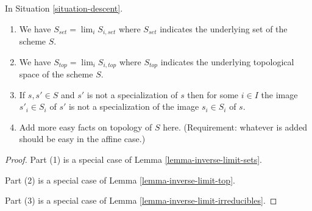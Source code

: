 \begin{lemma}
\label{lemma-topology-limit}
In Situation \ref{situation-descent}.
\begin{enumerate}
\item We have $S_{set} = \lim_i S_{i, set}$ where $S_{set}$
indicates the underlying set of the scheme $S$.
\item We have $S_{top} = \lim_i S_{i, top}$ where $S_{top}$
indicates the underlying topological space of the scheme $S$.
\item If $s, s' \in S$ and $s'$ is not a specialization of $s$
then for some $i \in I$ the image $s'_i \in S_i$ of $s'$ is not
a specialization of the image $s_i \in S_i$ of $s$.
\item Add more easy facts on topology of $S$ here.
(Requirement: whatever is added should be easy in the affine case.)
\end{enumerate}
\end{lemma}

\begin{proof}
Part (1) is a special case of Lemma \ref{lemma-inverse-limit-sets}.

\medskip\noindent
Part (2) is a special case of Lemma \ref{lemma-inverse-limit-top}.

\medskip\noindent
Part (3) is a special case of Lemma \ref{lemma-inverse-limit-irreducibles}.
\end{proof}
